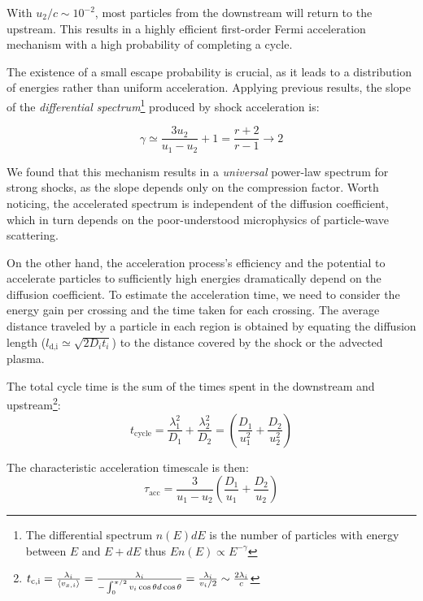 With \( u_2/c \sim 10^{-2} \), most particles from the downstream will return to the upstream. This results in a highly efficient first-order Fermi acceleration mechanism with a high probability of completing a cycle.

The existence of a small escape probability is crucial, as it leads to a distribution of energies rather than uniform acceleration. Applying previous results, the slope of the \emph{differential spectrum}\footnote{The differential spectrum \( n(E)dE \) is  the number of particles with energy between \( E \) and \( E + dE \) thus \( E n(E) \propto E^{-\gamma} \)} produced by shock acceleration is:
%
\begin{remark}
\begin{equation}
\gamma \simeq \frac{3 u_2}{u_1 - u_2} + 1 = \frac{r + 2}{r - 1} \rightarrow 2
\end{equation}
\end{remark}

We found that this mechanism results in a \emph{universal} power-law spectrum for strong shocks, as the slope depends only on the compression factor. Worth noticing, the accelerated spectrum is independent of the diffusion coefficient, which in turn depends on the poor-understood microphysics of particle-wave scattering.

On the other hand, the acceleration process's efficiency and the potential to accelerate particles to sufficiently high energies dramatically depend on the diffusion coefficient. 
%
To estimate the acceleration time, we need to consider the energy gain per crossing and the time taken for each crossing. %
The average distance traveled by a particle in each region is obtained by equating the diffusion length (\( l_{\text{d,i}} \simeq \sqrt{2 D_i t_i} \)) to the distance covered by the shock or the advected plasma.

The total cycle time is the sum of the times spent in the downstream and upstream\footnote{$
t_{\rm c, i} = \frac{\lambda_i}{\langle v_{x,i} \rangle} = \frac{\lambda_i}{-\int_0^{\pi/2} v_i \cos \theta d\cos\theta} = \frac{\lambda_i}{v_i / 2} \sim \frac{2\lambda_i}{c}$}:
%
\begin{equation}
t_{\text{cycle}} = \frac{\lambda_1^2}{D_1} + \frac{\lambda_2^2}{D_2} = \left(\frac{D_1}{u_1^2} + \frac{D_2}{u_2^2}\right)
\end{equation}

The characteristic acceleration timescale is then:
%
\begin{equation}
\tau_{\text{acc}} = \frac{3}{u_1 - u_2} \left( \frac{D_1}{u_1} + \frac{D_2}{u_2} \right)
\end{equation}


